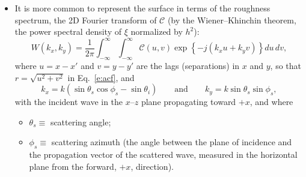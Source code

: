 \documentclass[11pt, oneside]{article}
\begin{document}
\begin{itemize}
	\item It is more common to represent the surface in terms of the roughness spectrum, the 2D Fourier transform of $\mathcal{C}$ (by the Wiener--Khinchin theorem, the power spectral density of $\xi$ normalized by $h^2$):
	\begin{equation}
		\label{e:W}
		W(k_x,k_y) = \frac{1}{2\pi}\int_{-\infty}^{\infty}\!\!\int_{-\infty}^{\infty}\mathcal{C}(u,v)\exp\left\{-j\left(k_xu + k_yv\right)\right\}du\,dv,
	\end{equation}
	where $u = x - x'$ and $v = y - y'$ are the lags (separations) in $x$ and $y$, so that $r = \sqrt{u^2 + v^2}$ in Eq.~\eqref{e:acf}, and
	\begin{equation}
		\label{e:kxky}
		k_x = k\left(\sin\theta_s\cos\phi_s - \sin\theta_i\right) \qquad \text{and} \qquad k_y = k\sin\theta_s\sin\phi_s,
	\end{equation}
	with the incident wave in the $x$--$z$ plane propagating toward $+x$, and where
	\begin{itemize}
		\item $\theta_s \equiv$ scattering angle;
		\item $\phi_s \equiv$ scattering azimuth (the angle between the plane of incidence and the propagation vector of the scattered wave, measured in the horizontal plane from the forward, $+x$, direction).

\end{itemize}
\end{itemize}
\end{document}
